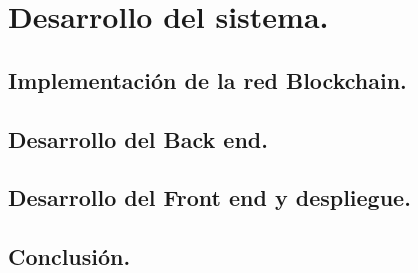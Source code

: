 \section{Desarrollo del sistema.}

\subsection{Implementación de la red Blockchain.}

\subsection{Desarrollo del Back end.}

\subsection{Desarrollo del Front end y despliegue.}

\subsection{Conclusión.}

\newpage